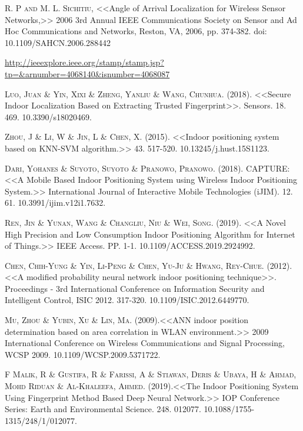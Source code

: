 \documentclass[12pt]{report}
\begin{document}
\begin{thebibliography}{X}
 \textsc{R. P and M. L. Sichitiu}, <<Angle of Arrival Localization for Wireless Sensor Networks,>> 2006 3rd Annual IEEE Communications Society on Sensor and Ad Hoc Communications and Networks, Reston, VA, 2006, pp. 374-382. doi: 10.1109/SAHCN.2006.288442

\url{http://ieeexplore.ieee.org/stamp/stamp.jsp?tp=&arnumber=4068140&isnumber=4068087}

 \textsc{Luo, Juan \& Yin, Xixi \& Zheng, Yanliu \& Wang, Chunhua.} (2018). <<Secure Indoor Localization Based on Extracting Trusted Fingerprint>>. Sensors. 18. 469. 10.3390/s18020469.

 \textsc{Zhou, J \& Li, W \& Jin, L \& Chen, X.} (2015). <<Indoor positioning system based on KNN-SVM algorithm.>> 43. 517-520. 10.13245/j.hust.15S1123.

\textsc{Dari, Yohanes \& Suyoto, Suyoto \& Pranowo, Pranowo.} (2018). CAPTURE: <<A Mobile Based Indoor Positioning System using Wireless Indoor Positioning System.>> International Journal of Interactive Mobile Technologies (iJIM). 12. 61. 10.3991/ijim.v12i1.7632. 

 \textsc{Ren, Jin \& Yunan, Wang \& Changliu, Niu \& Wei, Song}. (2019). <<A Novel High Precision and Low Consumption Indoor Positioning Algorithm for Internet of Things.>> IEEE Access. PP. 1-1. 10.1109/ACCESS.2019.2924992.

\textsc{Chen, Chih-Yung \& Yin, Li-Peng \& Chen, Yu-Ju \& Hwang, Rey-Chue}. (2012). <<A modified probability neural network indoor positioning technique>>. Proceedings - 3rd International Conference on Information Security and Intelligent Control, ISIC 2012. 317-320. 10.1109/ISIC.2012.6449770.

 \textsc{Mu, Zhou \& Yubin, Xu \& Lin, Ma}. (2009).<<ANN indoor position determination based on area correlation in WLAN environment.>> 2009 International Conference on Wireless Communications and Signal Processing, WCSP 2009. 10.1109/WCSP.2009.5371722. 

 \textsc{F Malik, R \& Gustifa, R \& Farissi, A \& Stiawan, Deris \& Ubaya, H \& Ahmad, Mohd Riduan \& Al-Khaleefa, Ahmed. (2019)}.<<The Indoor Positioning System Using Fingerprint Method Based Deep Neural Network.>> IOP Conference Series: Earth and Environmental Science. 248. 012077. 10.1088/1755-1315/248/1/012077. 
\end{thebibliography}


	\appendix
%	
	
\end{document}
